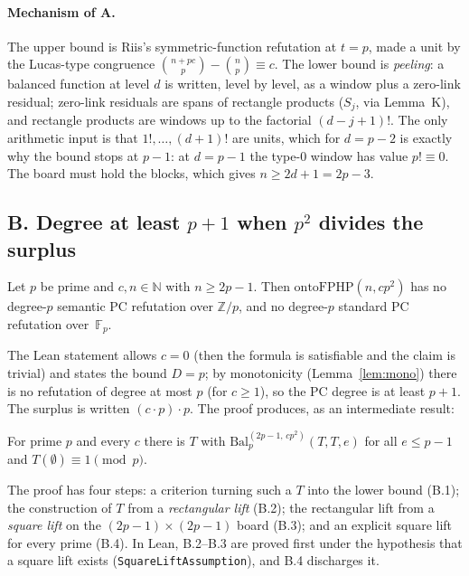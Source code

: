 \paragraph{Mechanism of A.}
The upper bound is Riis's symmetric-function refutation at $t=p$, made a unit by the
Lucas-type congruence $\binom{n+pc}p-\binom np\equiv c$.  The lower bound is
\emph{peeling}: a balanced function at level $d$ is written, level by level, as a
window plus a zero-link residual; zero-link residuals are spans of rectangle
products ($S_j$, via Lemma~K), and rectangle products are windows up to the factorial
$(d-j+1)!$.  The only arithmetic input is that $1!,\dots,(d+1)!$ are units, which for
$d=p-2$ is exactly why the bound stops at $p-1$: at $d=p-1$ the type-$0$ window has
value $p!\equiv0$.  The board must hold the blocks, which gives $n\ge 2d+1=2p-3$.

\subsection{B. Degree at least $p+1$ when $p^2$ divides the surplus}
\label{sec:lean-B}

\begin{theorem}[B]\label{thm:B}
Let $p$ be prime and $c,n\in\mathbb N$ with $n\ge2p-1$.  Then
$\mathrm{ontoFPHP}(n,cp^2)$ has no degree-$p$ semantic PC refutation over
$\mathbb Z/p$, and no degree-$p$ standard PC refutation
over~$\mathbb F_p$.
\end{theorem}

The Lean statement allows $c=0$ (then the formula is satisfiable and the claim is
trivial) and states the bound $D=p$; by monotonicity
(Lemma~\ref{lem:mono}) there is no
refutation of degree at most $p$ (for $c\ge1$), so the PC degree is at least $p+1$.  The surplus
is written $(c\cdot p)\cdot p$.  The proof produces, as an intermediate result:

\begin{theorem}\label{thm:B-design}
For prime $p$ and every $c$ there is $T$ with
$\mathrm{Bal}^{(2p-1,\,cp^2)}_p(T,T,e)$ for all $e\le p-1$ and
$T(\emptyset)\equiv1\pmod p$.
\end{theorem}

The proof has four steps: a criterion turning such a $T$ into the lower bound
(B.1); the construction of $T$ from a \emph{rectangular lift} (B.2); the rectangular
lift from a \emph{square lift} on the $(2p-1)\times(2p-1)$ board (B.3); and an
explicit square lift for every prime (B.4).  In Lean, B.2--B.3 are proved first
under the hypothesis that a square lift exists
(\texttt{SquareLiftAssumption}),
and B.4 discharges it.

